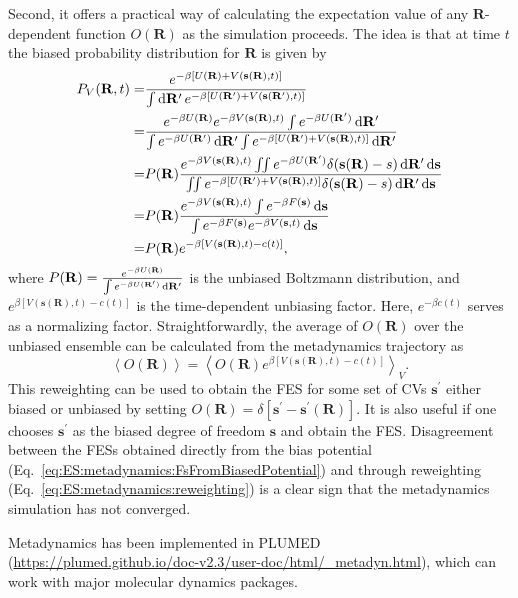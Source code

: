 Second, it offers a practical way of calculating the expectation value of any $\mathbf{R}$-dependent function $O(\mathbf{R})$ as the simulation proceeds. The idea is that at time $t$ the biased probability distribution for $\mathbf{R}$ is given by
\begin{align}
    P_V{(\mathbf{R},t)}=&\frac{e^{-\beta\left[U(\mathbf{R})+V(\mathbf{s}(\mathbf{R}),t)\right]}}{\int \diff \mathbf{R}^\prime\, e^{-\beta\left[U(\mathbf{R}^\prime)+V(\mathbf{s}(\mathbf{R}^\prime),t)\right]}}\notag\\
                       =&\frac{e^{-\beta U(\mathbf{R})}e^{-\beta V(\mathbf{s}(\mathbf{R}),t)}\int e^{-\beta U(\mathbf{R^\prime})}\diff \mathbf{R}^\prime}{\int e^{-\beta U(\mathbf{R^\prime})}\diff \mathbf{R}^\prime \int e^{-\beta \left[U(\mathbf{R}^\prime)+V(\mathbf{s}(\mathbf{R}),t)\right]}\diff \mathbf{R}^\prime}\notag\\
                       =&P(\mathbf{R})\frac{e^{-\beta V(\mathbf{s}(\mathbf{R}),t)}\iint e^{-\beta U(\mathbf{R^\prime})}\delta (\mathbf{s}(\mathbf{R})-s)\diff \mathbf{R}^\prime \diff \mathbf{s}}{\iint e^{-\beta \left[U(\mathbf{R}^\prime)+V(\mathbf{s}(\mathbf{R}),t)\right]}\delta (\mathbf{s}(\mathbf{R})-s)\diff \mathbf{R}^\prime \diff \mathbf{s}}\notag\\
                       =&P(\mathbf{R})\frac{e^{-\beta V(\mathbf{s}(\mathbf{R}),t)}\int e^{-\beta F(\mathbf{s})}\diff \mathbf{s}}{\int e^{-\beta F(\mathbf{s})}e^{-\beta V(\mathbf{s},t)}\diff \mathbf{s}}\notag\\
                       =&P{(\mathbf{R})}e^{-\beta\left[V(\mathbf{s}(\mathbf{R}),t)-c(t)\right]},
\end{align}
where $P{(\mathbf{R})}=\frac{e^{-\beta U(\mathbf{R})}}{\int e^{-\beta U(\mathbf{R}^\prime)}\mathop{}\!\mathrm{d} \mathbf{R}^\prime}$ is the unbiased Boltzmann distribution, and $e^{\beta\left[V(\mathbf{s}(\mathbf{R}),t)-c(t)\right]}$ is the time-dependent unbiasing factor. Here, $e^{-\beta c(t)}$ serves as a normalizing factor. Straightforwardly, the average of $O(\mathbf{R})$ over the unbiased ensemble can be calculated from the metadynamics trajectory as
\begin{equation}
    \left<O(\mathbf{R})\right>=\left<O(\mathbf{R})e^{\beta\left[V(\mathbf{s}(\mathbf{R}),t)-c(t)\right]}\right>_V.
    \label{eq:ES:metadynamics:reweighting}
\end{equation}
This reweighting can be used to obtain the FES for some set of CVs $\mathbf{s}^\prime$ either biased or unbiased by setting $O(\mathbf{R})=\delta[\mathbf{s}^\prime-\mathbf{s}^\prime(\mathbf{R})]$. It is also useful if one chooses $\mathbf{s}^\prime$ as the biased degree of freedom $\mathbf{s}$ and obtain the FES. Disagreement between the FESs obtained directly from the bias potential (Eq.~\ref{eq:ES:metadynamics:FsFromBiasedPotential}) and through reweighting (Eq.~\ref{eq:ES:metadynamics:reweighting}) is a clear sign that the metadynamics simulation has not converged.

Metadynamics has been implemented in PLUMED (\url{https://plumed.github.io/doc-v2.3/user-doc/html/_metadyn.html}), which can work with major molecular dynamics packages.